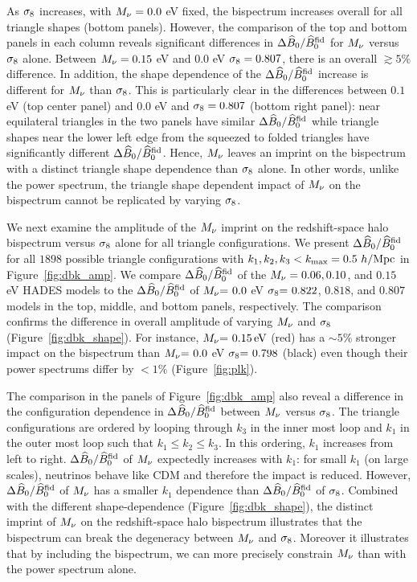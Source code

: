 As $\sigma_8$ increases, with $M_\nu = 0.0$ eV fixed, the bispectrum increases 
overall for all triangle shapes (bottom panels). However, the comparison of the
top and bottom panels in each column reveals significant differences in 
$\Delta \widehat{B}_0/\widehat{B}_0^{\rm fid}$ for $M_\nu$ versus $\sigma_8$ alone. Between 
$M_\nu=0.15$ eV and $0.0$ eV $\sigma_8 = 0.807$, there is an overall $\gtrsim 5\%$ 
difference. In addition, the shape dependence of the $\Delta \widehat{B}_0/\widehat{B}_0^{\rm fid}$ 
increase is different for $M_\nu$ than $\sigma_8$. This is particularly clear in 
the differences between $0.1$ eV (top center panel) and 0.0 eV and $\sigma_8=0.807$ 
(bottom right panel): near equilateral triangles in the two panels have similar 
$\Delta \widehat{B}_0/\widehat{B}_0^{\rm fid}$ while triangle shapes near the lower left edge from 
the squeezed to folded triangles have significantly different $\Delta \widehat{B}_0/\widehat{B}_0^{\rm fid}$. 
Hence, $M_\nu$ leaves an imprint on the bispectrum with a distinct triangle 
shape dependence than $\sigma_8$ alone. In other words, unlike the power spectrum, 
the triangle shape dependent impact of $M_\nu$ on the bispectrum cannot be 
replicated by varying $\sigma_8$. 

We next examine the amplitude of the $M_\nu$ imprint on the redshift-space halo 
bispectrum versus $\sigma_8$ alone for all triangle configurations. We present 
$\Delta \widehat{B}_0/\widehat{B}_0^{\rm fid}$ for all $1898$ possible triangle configurations 
with $k_1, k_2, k_3 < k_{\rm max} = 0.5~h/{\rm Mpc}$ in Figure~\ref{fig:dbk_amp}. 
We compare $\Delta \widehat{B}_0/\widehat{B}_0^{\rm fid}$ of the $M_\nu = 0.06, 0.10$, and 
$0.15$ eV HADES models to the $\Delta \widehat{B}_0/\widehat{B}_0^\mathrm{fid}$ of 
$M_\nu{=}~0.0$ eV $\sigma_8{=}~0.822$, $0.818$, and $0.807$ models in the
top, middle, and bottom panels, respectively. The comparison confirms the 
difference in overall amplitude of varying $M_\nu$ and $\sigma_8$ (Figure~\ref{fig:dbk_shape}). 
For instance, $M_\nu{=}~0.15\,\mathrm{eV}$ (red) has a $\sim 5\%$ stronger 
impact on the bispectrum than $M_\nu{=}~0.0$ eV $\sigma_8{=}~0.798$ (black) 
even though their power spectrums differ by $< 1\%$ (Figure~\ref{fig:plk}).

The comparison in the panels of Figure~\ref{fig:dbk_amp} also reveal a difference 
in the configuration dependence in $\Delta \widehat{B}_0/\widehat{B}_0^\mathrm{fid}$ between $M_\nu$ 
versus $\sigma_8$. The triangle configurations are ordered by looping through $k_3$ 
in the inner most loop and $k_1$ in the outer most loop such that $k_1 \leq k_2 \leq k_3$. 
In this ordering, $k_1$ increases from left to right. $\Delta \widehat{B}_0/\widehat{B}_0^\mathrm{fid}$ 
of $M_\nu$ expectedly increases with $k_1$: for small $k_1$ (on large scales), 
neutrinos behave like CDM and therefore the impact is reduced. However, 
$\Delta \widehat{B}_0/\widehat{B}_0^\mathrm{fid}$ of $M_\nu$ has a smaller $k_1$ dependence than 
$\Delta \widehat{B}_0/\widehat{B}_0^\mathrm{fid}$ of $\sigma_8$. Combined with the different shape-dependence
(Figure~\ref{fig:dbk_shape}), the distinct imprint of $M_\nu$ on the redshift-space 
halo bispectrum illustrates that the bispectrum can break the degeneracy between 
$M_\nu$ and $\sigma_8$. Moreover it illustrates that by including the bispectrum, we 
can more precisely constrain $M_\nu$ than with the power spectrum alone. 
